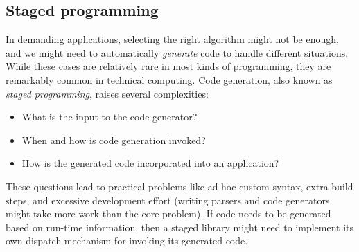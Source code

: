 



\subsection{Staged programming}

In demanding applications, selecting the right algorithm might not
be enough, and we might need to automatically \emph{generate} code
to handle different situations. While these cases are relatively rare
in most kinds of programming, they are remarkably common in technical
computing. Code generation, also known as \emph{staged programming},
raises several complexities:

\vspace{-3ex}
\begin{singlespace}
\begin{itemize}
\item What is the input to the code generator?
\item When and how is code generation invoked?
\item How is the generated code incorporated into an application?
\end{itemize}
\end{singlespace}

\noindent
These questions lead to practical problems like ad-hoc custom syntax,
extra build steps, and excessive development effort (writing parsers and
code generators might take more work than the core problem).
If code needs to be generated based on run-time information, then a
staged library might need to implement its own dispatch mechanism
for invoking its generated code.

